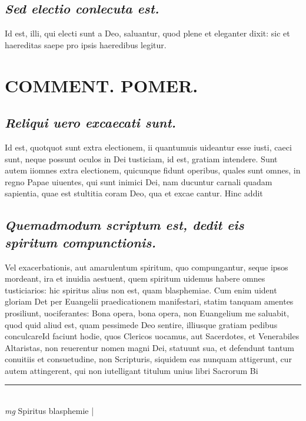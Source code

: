 \documentclass{article}
\begin{document}
\begin{pages}
\subsection*{\textit{Sed electio conlecuta est. }}\pstart Id est, illi, qui electi sunt a Deo, saluantur, quod plene et eleganter dixit: sic et haereditas saepe pro ipsis haeredibus legitur.   \pend
\section*{COMMENT. POMER.  }
{}
\subsection*{\textit{Reliqui uero excaecati sunt. }}\pstart Id est, quotquot sunt extra electionem, ii quantumuis uideantur esse iusti, caeci sunt, neque possunt oculos in Dei tusticiam, id est, gratiam intendere. Sunt autem iiomnes extra electionem, quicunque fidunt operibus, quales sunt omnes, in regno Papae uiuentes, qui sunt inimici Dei, nam ducuntur carnali quadam sapientia, quae est stultitia coram Deo, qua et excae cantur. Hinc addit  \pend
{}
{}
\subsection*{\textit{Quemadmodum scriptum est, dedit eis spiritum compunctionis. }}\pstart Vel exacerbationis, aut amarulentum spiritum, quo compungantur, seque ipsos mordeant, ira et inuidia aestuent, quem spiritum uidemus habere omnes tusticiarios: hic spiritus alius non est, quam blasphemiae. Cum enim uident gloriam Det per Euangelii praedicationem manifestari, statim tanquam amentes prosiliunt, uociferantes: Bona opera, bona opera, non Euangelium me saluabit, quod quid aliud est, quam pessimede Deo sentire, illiusque gratiam pedibus conculcareId faciunt hodie, quos Clericos uocamus, aut Sacerdotes, et Venerabiles Altaristas, non reuerentur nomen magni Dei, statuunt sua, et defendunt tantum conuitiis et consuetudine, non Scripturis, siquidem eas nunquam attigerunt, cur autem attingerent, qui non iutelligant titulum unius libri Sacrorum Bi\pend
\vspace{0.5cm}\noindent
\vspace{0.2cm}\rule{1cm}{0.2pt}\\ 
\hspace{0.2cm}\textit{mg}
\footnotesize Spiritus blasphemie 
\normalsize| 

\end{pages}
\end{document}
